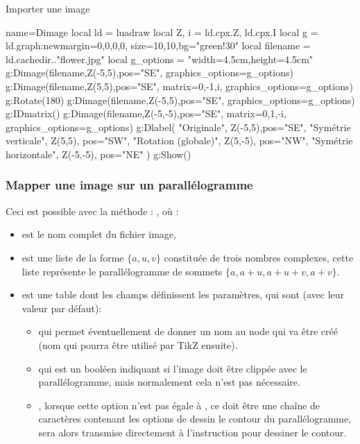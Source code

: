 \begin{demo}{Importer une image}
\begin{luadraw}{name=Dimage}
local ld = luadraw
local Z, i = ld.cpx.Z, ld.cpx.I
local g = ld.graph:new{margin={0,0,0,0}, size={10,10},bg="green!30"}
local filename = ld.cachedir.."flower.jpg"
local g_options = "width=4.5cm,height=4.5cm"
g:Dimage(filename,Z(-5,5),{pos="SE", graphics_options=g_options})
g:Dimage(filename,Z(5,5),{pos="SE", matrix={0,-1,i}, graphics_options=g_options})
g:Rotate(180)
g:Dimage(filename,Z(-5,5),{pos="SE", graphics_options=g_options})
g:IDmatrix()
g:Dimage(filename,Z(-5,-5),{pos="SE", matrix={0,1,-i}, graphics_options=g_options})
g:Dlabel( "Originale", Z(-5,5),{pos="SE"},
"Symétrie verticale", Z(5,5), {pos="SW"},
"Rotation (globale)", Z(5,-5), {pos="NW"},
"Symétrie horizontale", Z(-5,-5), {pos="NE"} )
g:Show()
\end{luadraw}
\end{demo}

\subsubsection{Mapper une image sur un parallélogramme}

Ceci est possible avec la méthode : , où :
\begin{itemize}
    \item  {} est le nom complet du fichier image, 
    \item {} est une liste de la forme $\{a,u,v\}$ constituée de trois nombres complexes, cette liste représente le parallélogramme de sommets $\{a,a+u,a+u+v,a+v\}$.
    \item {} est une table dont les champs définissent les paramètres, qui sont (avec leur valeur par défaut):
    \begin{itemize}
        \item {} qui permet éventuellement de donner un nom au node qui va être créé (nom qui pourra être utilisé par TikZ ensuite).
        \item {} qui est un booléen indiquant si l'image doit être clippée avec le parallélogramme, mais normalement cela n'est pas nécessaire.
        \item {}, lorsque cette option n'est pas égale à \nil, ce doit être une chaîne de caractères contenant les options de dessin le contour du parallélogramme,  sera alors transmise directement à l'instruction \drawcmd pour dessiner le contour.
    \end{itemize}    
\end{itemize}

